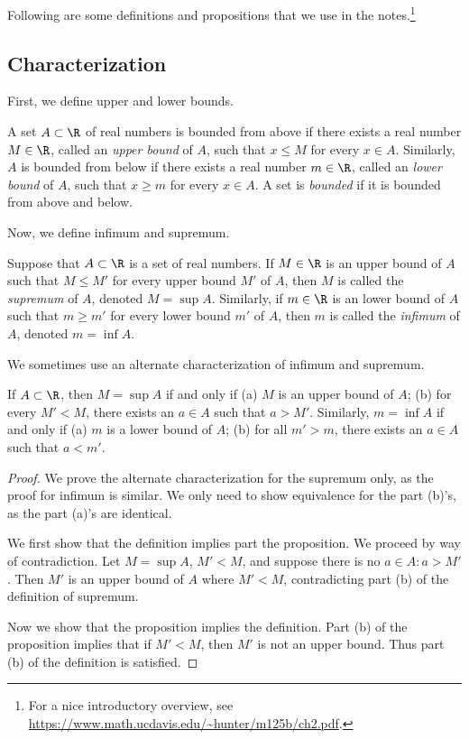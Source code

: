 \documentclass{article} %
\begin{document}
Following are some definitions and propositions that we use in the notes.\footnote{For a nice introductory overview, see \url{https://www.math.ucdavis.edu/~hunter/m125b/ch2.pdf}.}

\subsection{Characterization}

First, we define upper and lower bounds.
\begin{definition}
A set $A \subset \R$ of real numbers is bounded from above if there exists a real number $M \in \R$, called an \textit{upper bound} of $A$, such that $x \leq M$ for every $x \in A$.  Similarly, $A$  is bounded from below if there exists a real number $m \in \R$, called an \textit{lower bound} of $A$, such that $x \geq m$ for every $x \in A$.  A set is \textit{bounded} if it is bounded from above and below.
\label{def:upper_and_lower_bound}	
\end{definition}


Now, we define infimum and supremum.
\begin{definition}
Suppose that $A \subset \R$ is a set of real numbers. If $M \in \R$ is an upper bound of $A$ such that $M \leq M'$ for every upper bound $M'$ of $A$, then $M$ is called the \textit{supremum} of $A$, denoted $M=\sup A$.   Similarly, if $m \in \R$ is an lower bound of $A$ such that $m \geq m'$ for every lower bound $m'$ of $A$, then $m$ is called the \textit{infimum} of $A$, denoted $m=\inf A$.\label{def:supremum_and_infimum}	
\end{definition}

We sometimes use an alternate characterization of infimum and supremum.

\begin{proposition}

If $A \subset \R$, then $M = \sup A$ if and only if (a) $M$ is an upper bound of $A$; (b) for every $M' < M$, there exists an $a \in A$ such that $a>M'$.  Similarly, $m = \inf A$ if and only if (a) $m$ is a lower bound of $A$; (b) for all $m'>m$, there exists an $a \in A$ such that $a<m'$.
\label{prop:supremum_and_infimum_alternate_characterization}
\end{proposition}

\begin{proof}
We prove the alternate characterization for the supremum only, as the proof for infimum is similar.    We only need to show equivalence for the part (b)'s, as the part (a)'s are identical. 

We first show that the definition implies part the proposition.  We proceed by way of contradiction.  Let $M = \sup A$, $M' <M$, and suppose there is no $a \in A : a > M'$. Then $M'$ is an upper bound of $A$ where $M' <M$, contradicting part (b) of the definition of supremum.   

Now we show that the proposition implies the definition. Part (b) of the proposition implies that if $M' < M$, then $M'$ is not an upper bound. Thus part (b) of the definition is satisfied.
\end{proof}
\end{document}
